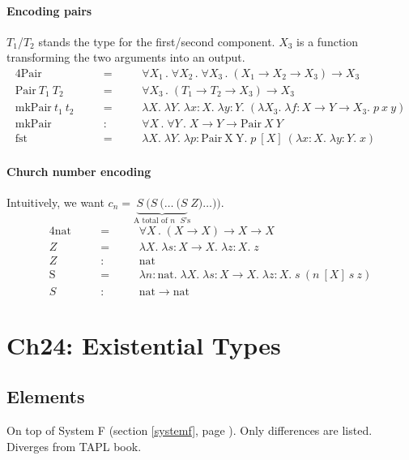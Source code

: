 \documentclass{article}
\newcommand{\lam}[2]{\lambda #1 .\;#2}
\newcommand{\lamt}[3]{\lambda #1: #2 .\;#3}
\newcommand{\uquant}[2]{\forall #1 \, .\; #2}
\begin{document}
\paragraph{Encoding pairs}
  $T_1$/$T_2$ stands the type for the first/second component.
  $X_3$ is a function transforming the two arguments into an output.
\begin{alignat*}{4}
  \mathrm{Pair} &\quad&=&\quad& \uquant{X_1}{\uquant{X_2}{\uquant{X_3}{(X_1\to X_2\to X_3) \to X_3}}}
  \\
  \mathrm{Pair}~T_1~T_2 &&=&& \uquant{X_3}{(T_1\to T_2\to X_3) \to X_3}
  \\
  \mathrm{mkPair}~t_1~t_2 &&=&& \lam{X}{\lam{Y}{
    \lamt{x}{X}{\lamt{y}{Y}{
      (\lam{X_3}{\lamt{f}{X\to Y\to X_3}{p~x~y}})
    }}
  }}
  \\
  \mathrm{mkPair} &&:&& \uquant{X}{\uquant{Y}{X \to Y \to \mathrm{Pair}~X~Y}}
  \\
  \mathrm{fst} &&=&& \lam{X}{\lam{Y}{
    \lamt{p}{\mathrm{Pair~X~Y}}{p~[X]~(\lamt{x}{X}{\lamt{y}{Y}{x}})}
  }}
\end{alignat*}

\paragraph{Church number encoding}
  Intuitively, we want $c_n = \underbrace{S~(S~(\ldots~(S}_{\text{A total of $n$ $S$'s}}Z)\ldots))$.
\begin{alignat*}{4}
  \mathrm{nat} &\quad&=&\quad& \uquant{X}{(X\to X)\to X \to X}
  \\
  Z &&=&& \lam{X}{
    \lamt{s}{X\to X}{\lamt{z}{X}{z}}
  }
  \\
  Z &&:&& \mathrm{nat}
  \\
  \mathrm{S} &&=&& \lamt{n}{\mathrm{nat}}{
    \lam{X}{
      \lamt{s}{X\to X}{\lamt{z}{X}{s~(n~[X]~s~z)}}
    }
  }
  \\
  S &&:&& \mathrm{nat}\to\mathrm{nat}
\end{alignat*}

\section{Ch24: Existential Types}
\subsection{Elements}
  On top of System F (section \ref{systemf}, page \pageref{systemf}).
  Only differences are listed. Diverges from TAPL book.
\end{document}
